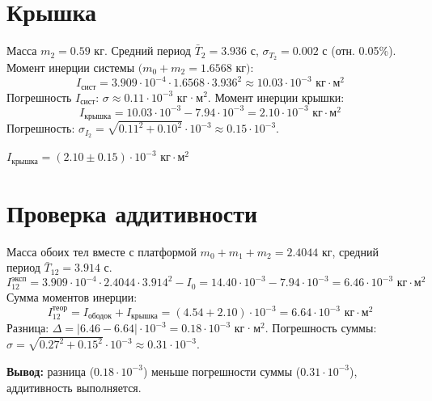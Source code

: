 \documentclass[12pt,a4paper]{article}
\begin{document}
\section{Крышка}
Масса \(m_2 = 0.59\) кг. Средний период \(\bar{T}_2 = 3.936\) с, \(\sigma_{T_2} = 0.002\) с (отн. 0.05\%).
Момент инерции системы \((m_0 + m_2 = 1.6568\) кг\()\):
\begin{equation}
    I_{\text{сист}} = 3.909 \cdot 10^{-4} \cdot 1.6568 \cdot 3.936^2 \approx 10.03 \cdot 10^{-3} \text{ кг}\cdot\text{м}^2
\end{equation}
Погрешность \(I_{\text{сист}}\): \(\sigma \approx 0.11 \cdot 10^{-3}\) кг·м\(^2\).
Момент инерции крышки:
\begin{equation}
    I_{\text{крышка}} = 10.03 \cdot 10^{-3} - 7.94 \cdot 10^{-3} = 2.10 \cdot 10^{-3} \text{ кг}\cdot\text{м}^2
\end{equation}
Погрешность: \(\sigma_{I_2} = \sqrt{0.11^2 + 0.10^2} \cdot 10^{-3} \approx 0.15 \cdot 10^{-3}\).
\begin{center}
\(I_{\text{крышка}} = (2.10 \pm 0.15) \cdot 10^{-3} \text{ кг}\cdot\text{м}^2\)
\end{center}

\section{Проверка аддитивности}
Масса обоих тел вместе с платформой \(m_0 + m_1 + m_2 = 2.4044\) кг, средний период \(\bar{T}_{12} = 3.914\) с.
\begin{equation}
    I_{12}^{\text{эксп}} = 3.909 \cdot 10^{-4} \cdot 2.4044 \cdot 3.914^2 - I_0 = 14.40 \cdot 10^{-3} - 7.94 \cdot 10^{-3} = 6.46 \cdot 10^{-3} \text{ кг}\cdot\text{м}^2
\end{equation}
Сумма моментов инерции:
\begin{equation}
    I_{12}^{\text{теор}} = I_{\text{ободок}} + I_{\text{крышка}} = (4.54 + 2.10) \cdot 10^{-3} = 6.64 \cdot 10^{-3} \text{ кг}\cdot\text{м}^2
\end{equation}
Разница: \(\Delta = |6.46 - 6.64| \cdot 10^{-3} = 0.18 \cdot 10^{-3}\) кг·м\(^2\). Погрешность суммы: \(\sigma = \sqrt{0.27^2 + 0.15^2} \cdot 10^{-3} \approx 0.31 \cdot 10^{-3}\).

\textbf{Вывод:} разница (\(0.18 \cdot 10^{-3}\)) меньше погрешности суммы (\(0.31 \cdot 10^{-3}\)), аддитивность выполняется.
\end{document}
